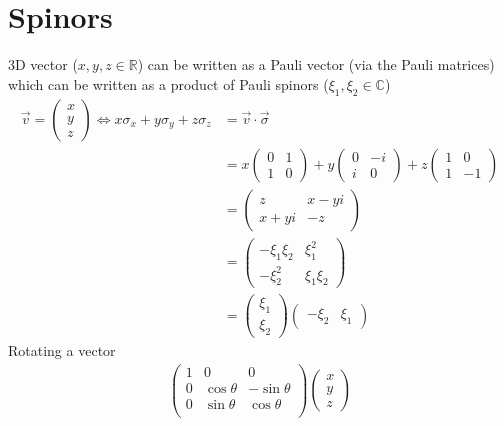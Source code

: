 \documentclass[10pt,a4paper]{book}
\theoremstyle{definition}
\begin{document}
\section{Spinors}
3D vector ($x,y,z\in\mathbb{R}$) can be written as a Pauli vector (via the Pauli matrices) which can be written as a product of Pauli spinors ($\xi_1,\xi_2\in\mathbb{C}$) 
\begin{align}
\vec{v}=
\left(
\begin{matrix}
x\\
y\\
z
\end{matrix}
\right)
\Longleftrightarrow
x\sigma_x+y\sigma_y+z\sigma_z
&=\vec{v}\cdot\vec{\sigma}\\
&=x\left(
\begin{matrix}
0    & 1\\
1 &  0
\end{matrix}
\right)+
y\left(
\begin{matrix}
0    & -i\\
i &  0
\end{matrix}
\right)+
z\left(
\begin{matrix}
1 & 0\\
1 &  -1
\end{matrix}
\right)\\
&=\left(
\begin{matrix}
z    & x-yi\\
x+yi &  -z
\end{matrix}
\right)\\
&=\left(
\begin{matrix}
-\xi_1\xi_2 & \xi_1^2\\
-\xi_2^2    & \xi_1\xi_2
\end{matrix}
\right)\\
&=\left(
\begin{matrix}
\xi_1 \\
\xi_2 
\end{matrix}
\right)
\left(
\begin{matrix}
-\xi_2&\xi_1 
\end{matrix}
\right)
\end{align}
Rotating a vector
\begin{align}
\left(
\begin{matrix}
1 & 0 & 0\\
0 & \cos\theta & -\sin\theta\\
0 & \sin\theta & \cos\theta\\
\end{matrix}
\right)\left(
\begin{matrix}
x\\
y\\
z
\end{matrix}
\right)
\end{align}
\end{document}
